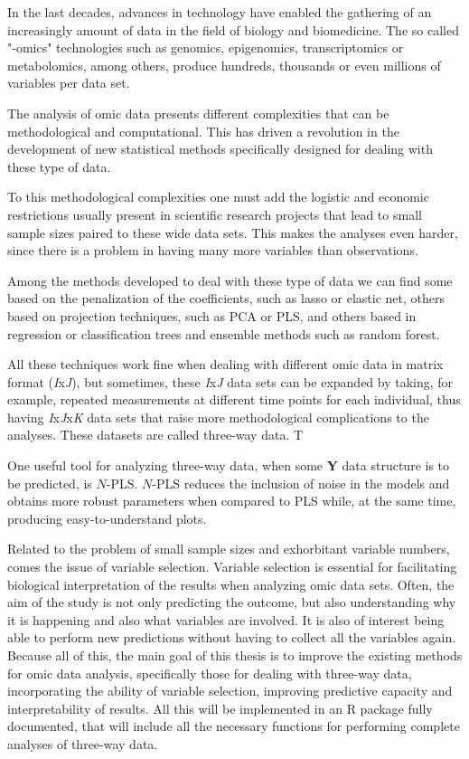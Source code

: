 In the last decades, advances in technology have enabled the gathering of an increasingly amount of data in the field of biology and biomedicine. The so called "-omics" technologies such as genomics, epigenomics, transcriptomics or metabolomics, among others, produce hundreds, thousands or even millions of variables per data set.

The analysis of omic data presents different complexities that can be methodological and computational. This has driven a revolution in the development of new statistical methods specifically designed for dealing with these type of data. 

To this methodological complexities one must add the logistic and economic restrictions usually present in scientific research projects that lead to small sample sizes paired to these wide data sets. This makes the analyses even harder, since there is a problem in having many more variables than observations.

Among the methods developed to deal with these type of data we can find some based on the penalization of the coefficients, such as lasso or elastic net, others based on projection techniques, such as PCA or PLS, and others based in regression or classification trees and ensemble methods such as random forest.

All these techniques work fine when dealing with different omic data in matrix format (\textit{I}x\textit{J}), but sometimes, these \textit{I}x\textit{J} data sets can be expanded by taking, for example, repeated measurements at different time points for each individual, thus having \textit{I}x\textit{J}x\textit{K} data sets that raise more methodological complications to the analyses. These datasets are called three-way data. T

One useful tool for analyzing three-way data, when some \textbf{Y} data structure is to be predicted, is $N$-PLS. $N$-PLS reduces the inclusion of noise in the models and obtains more robust parameters when compared to PLS while, at the same time, producing easy-to-understand plots.

Related to the problem of small sample sizes and exhorbitant variable numbers, comes the issue of variable selection. Variable selection is essential for facilitating biological interpretation of the results when analyzing omic data sets. Often, the aim of the study is not only predicting the outcome, but also understanding why it is happening and also what variables are involved. It is also of interest being able to perform new predictions without having to collect all the variables again. Because all of this, the main goal of this thesis is to improve the existing methods for omic data analysis, specifically those for dealing with three-way data, incorporating the ability of variable selection, improving predictive capacity and interpretability of results. All this will be implemented in an R package fully documented, that will include all the necessary functions for performing complete analyses of three-way data.

